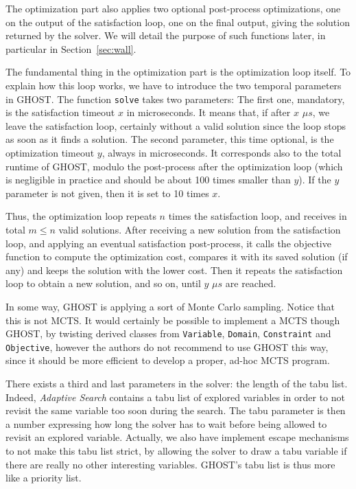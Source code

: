 \documentclass[journal]{IEEEtran}
\newcommand{\ghost}{\textsc{GHOST}\xspace}
\begin{document}
The  optimization   part  also   applies  two   optional  post-process
optimizations, one on the output of  the satisfaction loop, one on the
final output,  giving the  solution returned by  the solver.   We will
detail  the  purpose  of  such   functions  later,  in  particular  in
Section~\ref{sec:wall}.

The fundamental thing in the optimization part is the optimization
loop itself. To explain how this loop works, we have to introduce the
two temporal parameters in \ghost. The function \texttt{solve} takes
two parameters: The first one, mandatory, is the satisfaction timeout
$x$ in microseconds.  It means that, if after $x$ $\mu s$, we leave the
satisfaction loop, certainly without a valid solution since the loop
stops as soon as it finds a solution. The second parameter, this time
optional, is the optimization timeout $y$, always in microseconds. It
corresponds also to the total runtime of \ghost, modulo the
post-process after the optimization loop (which is negligible in
practice and should be about 100 times smaller than $y$). If the $y$
parameter is not given, then it is set to 10 times $x$.

Thus, the optimization  loop repeats $n$ times  the satisfaction loop,
and receives  in total $m \leq  n$ valid solutions. After  receiving a
new  solution from  the satisfaction  loop, and  applying an  eventual
satisfaction post-process, it calls  the objective function to compute
the optimization  cost, compares it  with its saved solution  (if any)
and  keeps the  solution with  the lower  cost.  Then  it repeats  the
satisfaction loop  to obtain a new  solution, and so on,  until $y$ $\mu s$
are reached.

In some way, \ghost is applying a sort of Monte Carlo sampling. Notice
that this  is not MCTS.   It would  certainly be possible to  implement a
MCTS    though   \ghost,    by   twisting    derived   classes    from
\texttt{Variable},     \texttt{Domain},    \texttt{Constraint}     and
\texttt{Objective}, however the authors do not recommend to use \ghost
this  way, since  it should  be more  efficient to  develop a  proper,
ad-hoc MCTS program.

There exists a third and last  parameters in the solver: the length of
the tabu list.  Indeed, {\it Adaptive  Search} contains a tabu list of
explored variables in order to not  revisit the same variable too soon
during the search. The tabu parameter  is then a number expressing how
long  the solver  has  to  wait before  being  allowed  to revisit  an
explored variable. Actually, we  also have implement escape mechanisms
to not make  this tabu list strict,  by allowing the solver  to draw a
tabu   variable   if   there   are   really   no   other   interesting
variables. \ghost's tabu list is thus more like a priority list.
\end{document}
